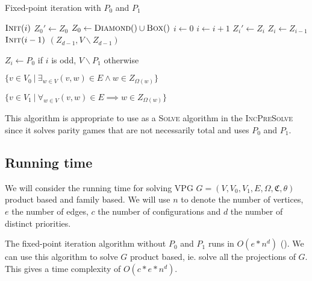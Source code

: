 \begin{algorithm}
	\caption{Fixed-point iteration with $P_0$ and $P_1$}
	\label{alg_FPITE}
	\begin{multicols}{2}
		\begin{algorithmic}[1]
					\State $\textsc{Init}(i)$
				\EndFor
				\Repeat
					\State $Z_0'\gets Z_0$
					\State $Z_0 \gets \textsc{Diamond}() \cup \textsc{Box}()$
					\State $i \gets 0$
						\State $i \gets i+1$
						\State $Z_i' \gets Z_i$
						\State $Z_i \gets Z_{i-1}$
						\State $\textsc{Init}(i-1)$
					\EndWhile
				\State \Return $(Z_{d-1},V\backslash Z_{d-1})$
			\EndFunction
		\end{algorithmic}\bigskip\bigskip
		\begin{algorithmic}[1]
			\Function{Init}{$i$}
				\State $Z_i \gets P_0$ if $i$ is odd, $V\backslash P_1$ otherwise
			\EndFunction
		\end{algorithmic}\bigskip
		\begin{algorithmic}[1]
			\Function{Diamond}{}
				\State \Return $\{ v \in V_0\ |\ \exists_{w\in V} (v,w) \in E \wedge w \in Z_{\Omega(w)}\}$
			\EndFunction
		\end{algorithmic}\bigskip
		\begin{algorithmic}[1]
			\Function{Box}{}
			\State \Return $\{ v \in V_1\ |\ \forall_{w\in V} (v,w) \in E \implies w \in Z_{\Omega(w)}\}$
			\EndFunction
		\end{algorithmic}
	\end{multicols}
\end{algorithm}

This algorithm is appropriate to use as a \textsc{Solve} algorithm in the \textsc{IncPreSolve} since it solves parity games that are not necessarily total and uses $P_0$ and $P_1$.

\subsection{Running time}
We will consider the running time for solving VPG $G = (V,V_0,V_1,E,\Omega,\mathfrak{C},\theta)$ product based and family based. We will use $n$ to denote the number of vertices, $e$ the number of edges, $c$ the number of configurations and $d$ the number of distinct priorities.

The fixed-point iteration algorithm without $P_0$ and $P_1$ runs in $O(e*n^d)$ (\cite{FPITE}). We can use this algorithm to solve $G$ product based, ie. solve all the projections of $G$. This gives a time complexity of $O(c*e*n^d)$.


